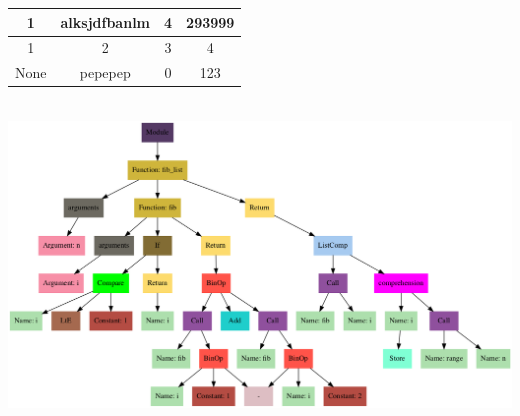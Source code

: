 \documentclass{article}
\begin{document}
\begin{tabular}{| c | c | c | c |}
\hline
1 & alksjdfbanlm & 4 & 293999\\
\hline
1 & 2 & 3 & 4\\
\hline
None & pepepep & 0 & 123\\
\hline
\end{tabular}\\
\includegraphics[scale=0.25]{fib.png}
\end{document}
